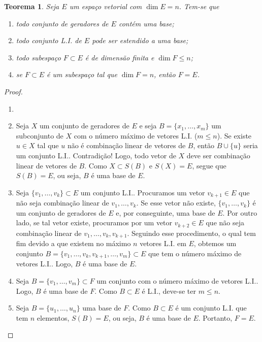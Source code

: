 \documentclass[12pt,a4paper]{article}
\newtheorem{thm}{Teorema}[section]
\theoremstyle{definition}
\begin{document}
\begin{thm}
  Seja $E$ um espaço vetorial com $\dim E=n$. Tem-se que
  \begin{enumerate}
  \item todo conjunto de geradores de $E$ contém uma base;
  \item todo conjunto L.I. de $E$ pode ser estendido a uma base;
  \item todo subespaço $F\subset E$ é de dimensão finita e
    $\dim F\le n$;
  \item se $F\subset E$ é um subespaço tal que $\dim F=n$, então
    $F=E$.
  \end{enumerate}
\end{thm}
\begin{proof}
  \begin{enumerate}
  \item[]
  \item Seja $X$ um conjunto de geradores de $E$ e seja
    $B=\{x_1,\ldots,x_m\}$ um subconjunto de $X$ com o número máximo
    de vetores L.I. ($m\le n$). Se existe $u\in X$ tal que $u$ não é
    combinação linear de vetores de $B$, então $B\cup\{u\}$ seria um
    conjunto L.I.. Contradição! Logo, todo vetor de $X$ deve ser
    combinação linear de vetores de $B$. Como $X\subset S(B)$ e
    $S(X)=E$, segue que $S(B)=E$, ou seja, $B$ é uma base de $E$.
  \item Seja $\{v_1,\ldots,v_k\}\subset E$ um conjunto
    L.I.. Procuramos um vetor $v_{k+1}\in E$ que não seja combinação
    linear de $v_1,\ldots,v_k$. Se esse vetor não existe,
    $\{v_1,\ldots,v_k\}$ é um conjunto de geradores de $E$ e, por
    conseguinte, uma base de $E$. Por outro lado, se tal vetor existe,
    procuramos por um vetor $v_{k+2}\in E$ que não seja combinação
    linear de $v_1,\ldots,v_k,v_{k+1}$. Seguindo esse procedimento, o
    qual tem fim devido a que existem no máximo $n$ vetores L.I. em
    $E$, obtemos um conjunto
    $B=\{v_1,\ldots,v_k,v_{k+1},\ldots,v_m\}\subset E$ que tem o
    número máximo de vetores L.I.. Logo, $B$ é uma base de $E$.
  \item Seja $B=\{v_1,\ldots,v_m\}\subset F$ um conjunto com o número
    máximo de vetores L.I.. Logo, $B$ é uma base de $F$. Como
    $B\subset E$ é L.I., deve-se ter $m\le n$.
  \item Seja $B=\{u_1,\ldots,u_n\}$ uma base de $F$. Como $B\subset E$
    é um conjunto L.I. que tem $n$ elementos, $S(B)=E$, ou seja, $B$ é
    uma base de $E$. Portanto, $F=E$.\qedhere
  \end{enumerate}
\end{proof}
\end{document}

